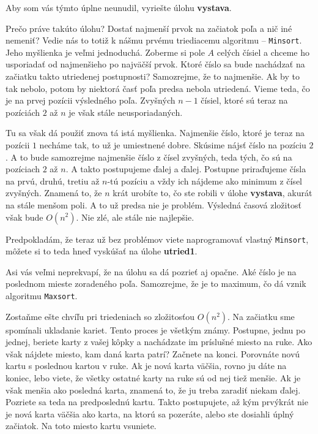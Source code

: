 \medskip

Aby som vás týmto úplne neunudil, vyriešte úlohu \textbf{vystava}.

\medskip

Prečo práve takúto úlohu? Dostať najmenší prvok na začiatok poľa a nič iné nemeniť? Vedie nás to
totiž k nášmu prvému triediacemu algoritmu -- \texttt{Minsort}. Jeho myšlienka je veľmi jednoduchá.
Zoberme si pole $A$ celých čísiel a chceme ho usporiadať od najmenšieho po najväčší prvok. Ktoré
číslo sa bude nachádzať na začiatku takto utriedenej postupnosti? Samozrejme, že to najmenšie. Ak by
to tak nebolo, potom by niektorá časť poľa predsa nebola utriedená. Vieme teda, čo je na prvej
pozícii výsledného poľa. Zvyšných $n-1$ čísiel, ktoré sú teraz na pozíciách $2$ až $n$ je však stále
neusporiadaných.

Tu sa však dá použiť znova tá istá myšlienka. Najmenšie číslo, ktoré je teraz na pozícii $1$ necháme
tak, to už je umiestnené dobre. Skúsime nájsť číslo na pozíciu $2$. A to bude samozrejme najmenšie
číslo z čísel zvyšných, teda tých, čo sú na pozíciach $2$ až $n$. A takto postupujeme ďalej a
ďalej. Postupne priraďujeme čísla na prvú, druhú, tretiu až $n$-tú pozíciu a vždy ich nájdeme ako
minimum z čísel zvyšných. Znamená to, že $n$ krát urobíte to, čo ste robili v úlohe
\textbf{vystava}, akurát na stále menšom poli. A to už predsa nie je problém.
Výsledná časová zložitosť však bude $O(n^2)$. Nie zlé, ale stále nie najlepšie.

\medskip

Predpokladám, že teraz už bez problémov viete naprogramovať vlastný \texttt{Minsort}, môžete si to
teda hneď vyskúšať na úlohe \textbf{utried1}.

\medskip

Asi vás veľmi neprekvapí, že na úlohu sa dá pozrieť aj opačne. Aké číslo je na poslednom mieste
zoradeného poľa. Samozrejme, že je to maximum, čo dá vznik algoritmu \texttt{Maxsort}.

\bigskip

Zostaňme ešte chvíľu pri triedeniach so zložitosťou $O(n^2)$. Na začiatku sme spomínali ukladanie
kariet. Tento proces je všetkým známy. Postupne, jednu po jednej, beriete karty z vašej kôpky a
nachádzate im príslušné miesto na ruke. Ako však nájdete miesto, kam daná karta patrí? Začnete na
konci. Porovnáte novú kartu s poslednou kartou v ruke. Ak je nová karta väčšia, rovno ju dáte na
koniec, lebo viete, že všetky ostatné karty na ruke sú od nej tiež menšie. Ak je však menšia ako
posledná karta, znamená to, že ju treba zaradiť niekam ďalej. Pozriete sa teda na predposlednú
kartu. Takto postupujete, až kým prvýkrát nie je nová karta väčšia ako karta, na ktorú sa pozeráte,
alebo ste dosiahli úplný začiatok. Na toto miesto kartu vsuniete.

